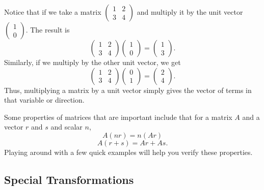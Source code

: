 \documentclass[
]{book}
\theoremstyle{definition}
\theoremstyle{definition}
\theoremstyle{definition}
\theoremstyle{definition}
\theoremstyle{remark}
\begin{document}
Notice that if we take a matrix \(\begin{pmatrix} 1 & 2 \\ 3 & 4 \end{pmatrix}\) and multiply it by the unit vector \(\begin{pmatrix} 1 \\ 0 \end{pmatrix}\). The result is \[\begin{pmatrix} 1 & 2 \\ 3 & 4 \end{pmatrix}\begin{pmatrix} 1 \\ 0 \end{pmatrix} = \begin{pmatrix} 1 \\ 3 \end{pmatrix}.\] Similarly, if we multiply by the other unit vector, we get \[\begin{pmatrix} 1 & 2 \\ 3 & 4 \end{pmatrix}\begin{pmatrix} 0 \\ 1 \end{pmatrix} = \begin{pmatrix} 2 \\ 4 \end{pmatrix}.\] Thus, multiplying a matrix by a unit vector simply gives the vector of terms in that variable or direction.

Some properties of matrices that are important include that for a matrix \(A\) and a vector \(r\) and \(s\) and scalar \(n\), \[A(nr) = n(Ar)\] \[A(r + s) = Ar + As.\] Playing around with a few quick examples will help you verify these properties.

\hypertarget{special-transformations}{%
\subsection{Special Transformations}\label{special-transformations}}
\end{document}
